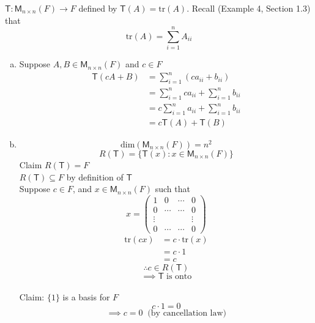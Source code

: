 $\mathsf{T}\colon\mathsf{M}_{n\times n}(F) \to F$ defined by
$\mathsf{T}(A) = \text{tr}(A)$. Recall (Example 4, Section 1.3) that
\[
\text{tr}(A) = \sum\limits_{i=1}^n A_{ii}
\]
\begin{enumerate}[(a)]
\item Suppose $A,B \in \mathsf{M}_{n\times n}(F)$ and $c\in F$
\begin{align}
\mathsf{T}(cA +B) &= \sum\limits_{i=1}^n(ca_{ii}+b_{ii})\\
&=\sum\limits_{i=1}^nca_{ii}+\sum\limits_{i=1}^nb_{ii}\\
&=c\sum\limits_{i=1}^na_{ii}+\sum\limits_{i=1}^nb_{ii}\\
&= c\mathsf{T}(A) + \mathsf{T}(B)
\end{align}
\item 
\begin{equation}
\text{dim}(\mathsf{M}_{n\times n}(F)) = n^2
\end{equation}
\begin{equation}
R(\mathsf{T}) =\{\mathsf{T}(x) \colon x \in \mathsf{M}_{n\times n}(F)\}
\end{equation}
Claim $R(\mathsf{T}) =F $
\\$R(\mathsf{T})\subseteq F$ by definition of $\mathsf{T}$
\\Suppose $c \in F$, and  $x \in \mathsf{M}_{n\times n}(F)$ such that 
\[
x = \begin{pmatrix}
1& 0 &\cdots & 0\\
0 & \cdots &\cdots& 0\\
\vdots & & &\vdots\\
0 & \cdots & \cdots& 0 
\end{pmatrix}
\]
\begin{align}
\text{tr}(cx) &= c\cdot\text{tr}(x) \\
&= c \cdot 1 \\
&= c
\end{align}
\begin{equation}
\therefore c \in R(\mathsf{T})
\end{equation}
\begin{equation}
\implies \mathsf{T}\;\text{is onto}
\end{equation}
\\Claim: $\{1\}$ is a basis for $F$
\begin{equation}
c \cdot 1 = 0
\end{equation}
\begin{equation}
\implies c = 0\;\; \text{(by cancellation law)}
\end{equation}

\end{enumerate}
